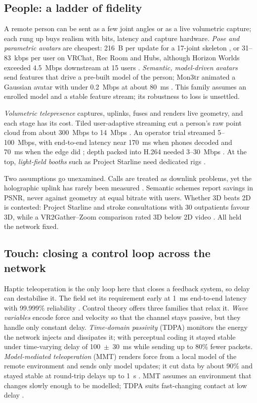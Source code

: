 \subsection{People: a ladder of fidelity}

A remote person can be sent as a few joint angles or as a live volumetric capture; each rung up buys realism with bits, latency and capture hardware. \emph{Pose and parametric avatars} are cheapest: 216~B per update for a 17-joint skeleton \cite{W2922194619}, or 31--83~kbps per user on VRChat, Rec Room and Hubs, although Horizon Worlds exceeded 4.5~Mbps downstream at 15 users \cite{W4307020344}. \emph{Semantic, model-driven avatars} send features that drive a pre-built model of the person; Mon3tr animated a Gaussian avatar with under 0.2~Mbps at about 80~ms \cite{W7123904049}. This family assumes an enrolled model and a stable feature stream; its robustness to loss is unsettled.

\emph{Volumetric telepresence} captures, uplinks, fuses and renders live geometry, and each stage has its cost. Tiled user-adaptive streaming cut a person's raw point cloud from about 300~Mbps to 14~Mbps \cite{W4304091566}. An operator trial streamed 5--100~Mbps, with end-to-end latency near 170~ms when phones decoded and 70~ms when the edge did \cite{W4312662428}; depth packed into H.264 needed 3--30~Mbps \cite{W4307263396}. At the top, \emph{light-field booths} such as Project Starline need dedicated rigs \cite{W4200107448}.

Two assumptions go unexamined. Calls are treated as downlink problems, yet the holographic uplink has rarely been measured \cite{W4416047836}. Semantic schemes report savings in PSNR, never against geometry at equal bitrate with users. Whether 3D beats 2D is contested: Project Starline \cite{W4200107448} and stroke consultations with 30 outpatients \cite{W4400580381} favour 3D, while a VR2Gather--Zoom comparison rated 3D below 2D video \cite{W4415708482}. All held the network fixed.

\subsection{Touch: closing a control loop across the network}

Haptic teleoperation is the only loop here that closes a feedback system, so delay can destabilise it. The field set its requirement early at 1~ms end-to-end latency with 99.999\% reliability \cite{W2216406802}. Control theory offers three families that relax it. \emph{Wave variables} encode force and velocity so that the channel stays passive, but they handle only constant delay. \emph{Time-domain passivity} (TDPA) monitors the energy the network injects and dissipates it; with perceptual coding it stayed stable under time-varying delay of 100~$\pm$~30~ms while sending up to 80\% fewer packets. \emph{Model-mediated teleoperation} (MMT) renders force from a local model of the remote environment and sends only model updates; it cut data by about 90\% and stayed stable at round-trip delays up to 1~s \cite{W2811040154}. MMT assumes an environment that changes slowly enough to be modelled; TDPA suits fast-changing contact at low delay \cite{W2963793563}.

